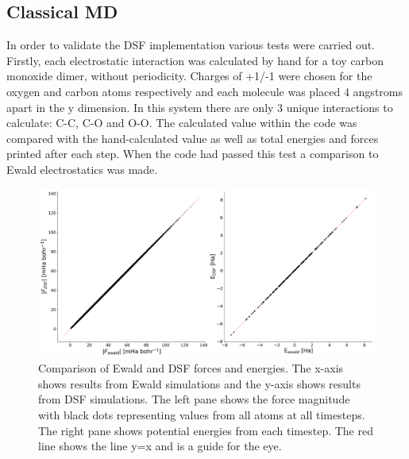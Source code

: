 \subsection{Classical MD}
\label{sect:ClassicalMDEwald}
In order to validate the DSF implementation various tests were carried out. Firstly, each electrostatic interaction was calculated by hand for a toy carbon monoxide dimer, without periodicity. Charges of +1/-1 were chosen for the oxygen and carbon atoms respectively and each molecule was placed 4 angstroms apart in the y dimension. In this system there are only 3 unique interactions to calculate: C-C, C-O and O-O. The calculated value within the code was compared with the hand-calculated value as well as total energies and forces printed after each step. When the code had passed this test a comparison to Ewald electrostatics was made.
\\
\begin{figure}[ht]
  \includegraphics[width=\textwidth]{../img/ES/Ewald_DSF_Classical.png}
  \caption{\label{fig:Classical_DSF_Ewald}Comparison of Ewald and DSF forces and energies. The x-axis shows results from Ewald simulations and the y-axis shows results from DSF simulations. The left pane shows the force magnitude with black dots representing values from all atoms at all timesteps. The right pane shows potential energies from each timestep. The red line shows the line y=x and is a guide for the eye.}
\end{figure}
\\
